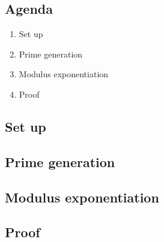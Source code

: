 

\subsection{Agenda}
\begin{enumerate}
\item Set up
\item Prime generation
\item Modulus exponentiation
\item Proof
\end{enumerate}

\subsection{Set up}

\subsection{Prime generation}

\subsection{Modulus exponentiation}

\subsection{Proof}

